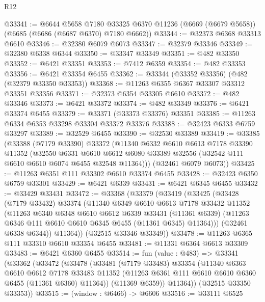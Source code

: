 \begin{lexlean}{R12}
\begin{coremodule}
@33341 := @6644
    @5658
    @7180
    @33325
    @6370
    @11236
    (@6669 (@6679 @5658))
    (@6685 (@6686 (@6687 @6370) @7180 @6662))
@33344 := @32373 @6368 @33313 @6610
@33346 := @32380 @6079 @6073
@33347 := @32379 @33346
@33349 := @32380 @6338 @6344
@33350 := @33347 @33349
@33351 := @482 @33350
@33352 := @6421 @33351
@33353 := @7412 @6359
@33354 := @482 @33353
@33356 := @6421 @33354 @6455
@33362 := @33344 (@33352 @33356) (@482 (@32379 @33350 @33353))
@33368 := @11263 @6355 @6367 @33307 @33312 @33351 @33356
@33371 := @32373 @6354 @33305 @6610
@33372 := @482 @33346
@33373 := @6421 @33372
@33374 := @482 @33349
@33376 := @6421 @33374 @6455
@33379 := @33371 (@33373 @33376) @33351
@33385 := @11263 @6334 @6353 @33298 @33304 @33372 @33376
@33388 := @32423 @6333 @6759 @33297
@33389 := @32529 @6455
@33390 := @32530 @33389
@33419 := @33385
    (@33388
      (@7179 @33390)
      @33372
      (@11340
        @6332
        @6610
        @6613
        @7178
        @33390
        @11352
        (@32550
          @6331
          @6610
          @6612
          @6080
          @33389
          @32556
          (@32542 @111 @6610 @6610 @6074 @6455 @32548 @11364)))
      (@32461 @6079 @6073))
@33425 := @11263 @6351 @111 @33302 @6610 @33374 @6455
@33428 := @32423 @6350 @6759 @33301
@33429 := @6421 @6339
@33431 := @6421 @6345 @6455
@33432 := @33429 @33431
@33472 := @33368
    (@33379
      (@33419
        (@33425
          (@33428
            (@7179 @33432)
            @33374
            (@11340
              @6349
              @6610
              @6613
              @7178
              @33432
              @11352
              (@11263
                @6340
                @6348
                @6610
                @6612
                @6339
                @33431
                (@11361 @6339)
                (@11263 @6346 @111 @6610 @6610 @6345 @6455 (@11361 @6345) @11364)))
            (@32461 @6338 @6344))
          @11364))
      (@32515 @33346 @33349))
@33478 := @11263 @6365 @111 @33310 @6610 @33354 @6455
@33481 := @11331 @6364 @6613 @33309
@33483 := @6421 @6360 @6455
@33514 := fun (value : @483) =>
  @33341
    (@33362
      (@33472
        (@33478
          (@33481
            (@7179 @33483)
            @33354
            (@11340
              @6363
              @6610
              @6612
              @7178
              @33483
              @11352
              (@11263 @6361 @111 @6610 @6610 @6360 @6455 (@11361 @6360) @11364))
            (@11369 @6359))
          @11364))
      (@32515 @33350 @33353))
@33515 := (window : @6466) -> @6606
@33516 := @33111 @6525

\end{coremodule}
\end{lexlean}
